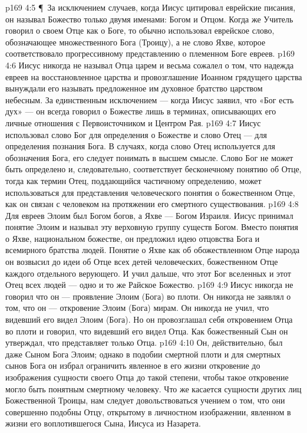 \vs p169 4:5 \P\ За исключением случаев, когда Иисус цитировал еврейские писания, он называл Божество только двумя именами: Богом и Отцом. Когда же Учитель говорил о своем Отце как о Боге, то обычно использовал еврейское слово, обозначающее множественного Бога (Троицу), а не слово Яхве, которое соответствовало прогрессивному представлению о племенном Боге евреев.
\vs p169 4:6 Иисус никогда не называл Отца царем и весьма сожалел о том, что надежда евреев на восстановленное царства и провозглашение Иоанном грядущего царства вынуждали его называть предложенное им духовное братство царством небесным. За единственным исключением --- когда Иисус заявил, что «Бог есть дух» --- он всегда говорил о Божестве лишь в терминах, описывающих его личные отношения с Первоисточником и Центром Рая.
\vs p169 4:7 Иисус использовал слово Бог для определения  о Божестве и слово Отец --- для определения  познания Бога. В случаях, когда слово Отец используется для обозначения Бога, его следует понимать в высшем смысле. Слово Бог не может быть определено и, следовательно, соответствует бесконечному понятию об Отце, тогда как термин Отец, поддающийся частичному определению, может использоваться для представления человеческого понятия о божественном Отце, как он связан с человеком на протяжении его смертного существования.
\vs p169 4:8 Для евреев Элоим был Богом богов, а Яхве --- Богом Израиля. Иисус принимал понятие Элоим и называл эту верховную группу существ Богом. Вместо понятия о Яхве, национальном божестве, он предложил идею отцовства Бога и всемирного братства людей. Понятие о Яхве как об обожествленном Отце народа он возвысил до идеи об Отце всех детей человеческих, божественном Отце каждого отдельного верующего. И учил дальше, что этот Бог вселенных и этот Отец всех людей --- одно и то же Райское Божество.
\vs p169 4:9 Иисус никогда не говорил что он --- проявление Элоим (Бога) во плоти. Он никогда не заявлял о том, что он --- откровение Элоим (Бога) мирам. Он никогда не учил, что видевший его видел Элоим (Бога). Но он провозглашал себя откровением Отца во плоти и говорил, что видевший его видел Отца. Как божественный Сын он утверждал, что представляет только Отца.
\vs p169 4:10 Он, действительно, был даже Сыном Бога Элоим; однако в подобии смертной плоти и для смертных сынов Бога он избрал ограничить явленное в его жизни откровение до изображения сущности своего Отца до такой степени, чтобы такое откровение могло быть понятным смертному человеку. Что же касается сущности других лиц Божественной Троицы, нам следует довольствоваться учением о том, что они совершенно подобны Отцу, открытому в личностном изображении, явленном в жизни его воплотившегося Сына, Иисуса из Назарета.
